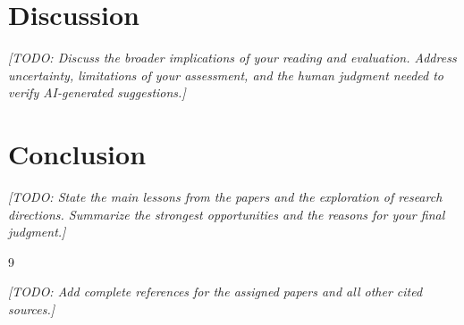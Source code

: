 \documentclass[11pt,letterpaper]{article}
\newcommand{\placeholder}[1]{\textit{[TODO: #1]}}
\begin{document}

\section{Discussion}
\label{sec:discussion}

\placeholder{Discuss the broader implications of your reading and evaluation.
Address uncertainty, limitations of your assessment, and the human judgment
needed to verify AI-generated suggestions.}

\section{Conclusion}
\label{sec:conclusion}

\placeholder{State the main lessons from the papers and the exploration of
research directions. Summarize the strongest opportunities and the reasons for
your final judgment.}

\begin{thebibliography}{9}
\item[] \placeholder{Add complete references for the assigned papers and all
other cited sources.}

\end{thebibliography}

\end{document}
